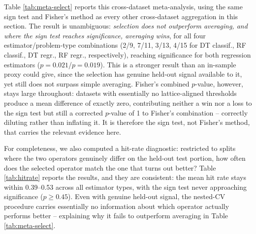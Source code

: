 \documentclass[5p,twocolumn,authoryear]{elsarticle}
\theoremstyle{plain}%
\theoremstyle{remark}%
\theoremstyle{definition}%
\begin{document}
\begin{table}[tbp]
  \caption{Cross-dataset meta-analysis of the nested-CV operator-selection procedure of Section \ref{sec:tests-model} against the proposed averaging method, across the 20-dataset pool for each of the four estimator/problem type combinations. \emph{wins/losses} counts, among datasets with a nonzero mean difference, how many favor the selection procedure versus the averaging method (datasets tied at exactly zero, see below, are excluded from this count but not from Fisher's combination); a negative skew (more losses than wins) means the averaging method beats operator selection more often than the reverse. The sign-test $p$-value tests the wins/losses split against the 50/50 null; Fisher $p$ combines all 20 datasets' corrected $p$-values (Section \ref{sec:tests-testing}) into a single statistic; $n_{sig}$ counts datasets individually significant under the corrected test alone.}
  \label{tab:meta-select}
  \centering
    \begin{small}
      
    \end{small}
\end{table}

Table \ref{tab:meta-select} reports this cross-dataset meta-analysis, using the same sign test and Fisher's method as every other cross-dataset aggregation in this section. The result is unambiguous: \emph{selection does not outperform averaging, and where the sign test reaches significance, averaging wins}, for all four estimator/problem-type combinations (2/9, 7/11, 3/13, 4/15 for DT classif., RF classif., DT regr., RF regr., respectively), reaching significance for both regression estimators ($p=0.021$/$p=0.019$). This is a stronger result than an in-sample proxy could give, since the selection has genuine held-out signal available to it, yet still does not surpass simple averaging. Fisher's combined $p$-value, however, stays large throughout: datasets with essentially no lattice-aligned thresholds produce a mean difference of exactly zero, contributing neither a win nor a loss to the sign test but still a corrected $p$-value of 1 to Fisher's combination -- correctly diluting rather than inflating it. It is therefore the sign test, not Fisher's method, that carries the relevant evidence here.

For completeness, we also computed a hit-rate diagnostic: restricted to splits where the two operators genuinely differ on the held-out test portion, how often does the selected operator match the one that turns out better? Table \ref{tab:hitrate} reports the results, and they are consistent: the mean hit rate stays within 0.39--0.53 across all estimator types, with the sign test never approaching significance ($p \ge 0.45$). Even with genuine held-out signal, the nested-CV procedure carries essentially no information about which operator actually performs better -- explaining why it fails to outperform averaging in Table \ref{tab:meta-select}.
\end{document}
